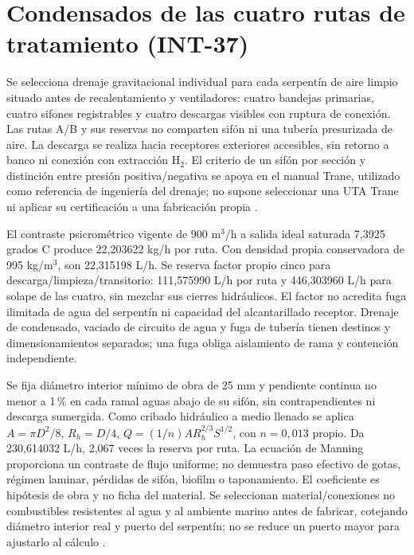 \section{Condensados de las cuatro rutas de tratamiento (INT-37)}
\label{sec:sd4-drenaje-int37}
Se selecciona drenaje gravitacional individual para cada serpentín de aire limpio situado antes de recalentamiento y ventiladores: cuatro bandejas primarias, cuatro sifones registrables y cuatro descargas visibles con ruptura de conexión. Las rutas A/B y sus reservas no comparten sifón ni una tubería presurizada de aire. La descarga se realiza hacia receptores exteriores accesibles, sin retorno a banco ni conexión con extracción H$_2$. El criterio de un sifón por sección y distinción entre presión positiva/negativa se apoya en el manual Trane, utilizado como referencia de ingeniería del drenaje; no supone seleccionar una UTA Trane ni aplicar su certificación a una fabricación propia \parencite[pp.~54--55, figs.~50--51]{int37-trane-drenaje}.

El contraste psicrométrico vigente de 900 m$^3$/h a salida ideal saturada 7,3925 grados C produce 22,203622 kg/h por ruta. Con densidad propia conservadora de 995 kg/m$^3$, son 22,315198 L/h. Se reserva factor propio cinco para descarga/limpieza/transitorio: 111,575990 L/h por ruta y 446,303960 L/h para solape de las cuatro, sin mezclar sus cierres hidráulicos. El factor no acredita fuga ilimitada de agua del serpentín ni capacidad del alcantarillado receptor. Drenaje de condensado, vaciado de circuito de agua y fuga de tubería tienen destinos y dimensionamientos separados; una fuga obliga aislamiento de rama y contención independiente.

Se fija diámetro interior mínimo de obra de 25 mm y pendiente continua no menor a 1\,\% en cada ramal aguas abajo de su sifón, sin contrapendientes ni descarga sumergida. Como cribado hidráulico a medio llenado se aplica $A=\pi D^2/8$, $R_h=D/4$, $Q=(1/n)AR_h^{2/3}S^{1/2}$, con $n=0,013$ propio. Da 230,614032 L/h, 2,067 veces la reserva por ruta. La ecuación de Manning proporciona un contraste de flujo uniforme; no demuestra paso efectivo de gotas, régimen laminar, pérdidas de sifón, biofilm o taponamiento. El coeficiente es hipótesis de obra y no ficha del material. Se seleccionan material/conexiones no combustibles resistentes al agua y al ambiente marino antes de fabricar, cotejando diámetro interior real y puerto del serpentín; no se reduce un puerto mayor para ajustarlo al cálculo \parencite[ec.~3-23 y sec.~5.5.2]{int37-epa-manning}.

